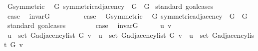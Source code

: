 \begin{isabellebody}
\ G{}{\isacharunderscore}{\kern0pt}symmetric\ \isacommand{{\isachardot}{\kern0pt}}\isamarkupfalse%
\isanewline
{}\isamarkupfalse%
%
\endisatagproof
{\isafoldproof}%
%
\isadelimproof
\isanewline
%
\endisadelimproof
\isanewline
{}\isamarkupfalse%
\ G{}{\isacharcolon}{\kern0pt}\ symmetric{\isacharunderscore}{\kern0pt}adjacency\ \ G\ {\isacharequal}{\kern0pt}\ G{}\isanewline
%
\isadelimproof
%
\endisadelimproof
%
\isatagproof
{}\isamarkupfalse%
\ {\isacharparenleft}{\kern0pt}standard{\isacharcomma}{\kern0pt}\ goal{\isacharunderscore}{\kern0pt}cases{\isacharparenright}{\kern0pt}\isanewline
\ \ \isamarkupfalse%
\ {}\isanewline
\ \ \isamarkupfalse%
\ {\isacharquery}{\kern0pt}case\ \isamarkupfalse%
\ invar{\isacharunderscore}{\kern0pt}G{}\ \isacommand{{\isachardot}{\kern0pt}}\isamarkupfalse%
\isanewline
{}\isamarkupfalse%
\isanewline
\ \ \isamarkupfalse%
\ {}\isanewline
\ \ \isamarkupfalse%
\ {\isacharquery}{\kern0pt}case\ \isamarkupfalse%
\ G{}{\isacharunderscore}{\kern0pt}symmetric\ \isacommand{{\isachardot}{\kern0pt}}\isamarkupfalse%
\isanewline
{}\isamarkupfalse%
%
\endisatagproof
{\isafoldproof}%
%
\isadelimproof
\isanewline
%
\endisadelimproof
\isanewline
{}\isamarkupfalse%
\ G{\isacharcolon}{\kern0pt}\ symmetric{\isacharunderscore}{\kern0pt}adjacency\ \ G\ {\isacharequal}{\kern0pt}\ G\isanewline
%
\isadelimproof
%
\endisadelimproof
%
\isatagproof
{}\isamarkupfalse%
\ {\isacharparenleft}{\kern0pt}standard{\isacharcomma}{\kern0pt}\ goal{\isacharunderscore}{\kern0pt}cases{\isacharparenright}{\kern0pt}\isanewline
\ \ \isamarkupfalse%
\ {}\isanewline
\ \ \isamarkupfalse%
\ {\isacharquery}{\kern0pt}case\ \isamarkupfalse%
\ invar{\isacharunderscore}{\kern0pt}G\ \isacommand{{\isachardot}{\kern0pt}}\isamarkupfalse%
\isanewline
{}\isamarkupfalse%
\isanewline
\ \ \isamarkupfalse%
\ {\isacharparenleft}{\kern0pt}{}\ u\ v{\isacharparenright}{\kern0pt}\isanewline
\ \ \isamarkupfalse%
\ {\isachardoublequoteopen}u\ {\isasymin}\ set\ {\isacharparenleft}{\kern0pt}G{\isachardot}{\kern0pt}adjacency{\isacharunderscore}{\kern0pt}list\ G\ v{\isacharparenright}{\kern0pt}\ {\isasymlongleftrightarrow}\ u\ {\isasymin}\ set\ {\isacharparenleft}{\kern0pt}G{\isachardot}{\kern0pt}adjacency{\isacharunderscore}{\kern0pt}list\ G{}\ v{\isacharparenright}{\kern0pt}\ {\isasymor}\ u\ {\isasymin}\ set\ {\isacharparenleft}{\kern0pt}G{\isachardot}{\kern0pt}adjacency{\isacharunderscore}{\kern0pt}list\ G{}\ v{\isacharparenright}{\kern0pt}{\isachardoublequoteclose}\isanewline

\end{isabellebody}

